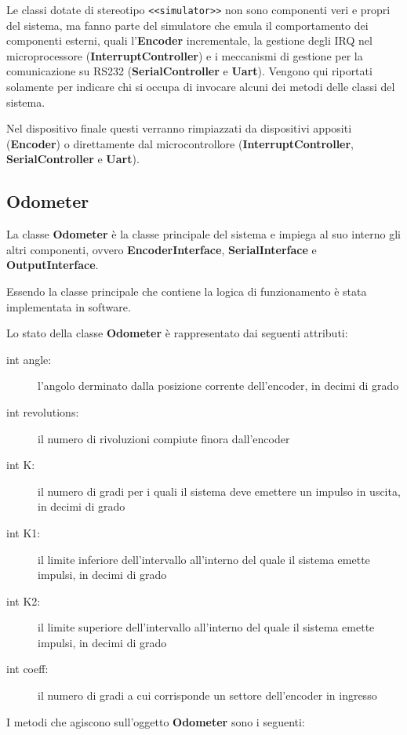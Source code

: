 \documentclass [11pt,a4paper,oneside]{paper}
\newcommand{\component}[1]{\textbf{#1}}
\newcommand{\identifier}[1]{\texttt{#1}}
\begin{document}
Le classi dotate di stereotipo \identifier{<<simulator>>} non sono
componenti veri e propri del sistema, ma fanno parte del simulatore
che emula il comportamento dei componenti esterni, quali
l'\component{Encoder} incrementale, la gestione degli IRQ nel
microprocessore (\component{InterruptController}) e i meccanismi di gestione per la
comunicazione su RS232 (\component{SerialController} e \component{Uart}).
Vengono qui riportati solamente per indicare chi si occupa di invocare
alcuni dei metodi delle classi del sistema.

Nel dispositivo finale questi verranno rimpiazzati da dispositivi appositi
(\component{Encoder}) o direttamente dal microcontrollore
(\component{InterruptController}, \component{SerialController} e
\component{Uart}).

\subsection{Odometer}
La classe \component{Odometer} è la classe principale del sistema e
impiega al suo interno gli altri componenti, ovvero 
\component{EncoderInterface}, \component{SerialInterface} e
\component{OutputInterface}.

Essendo la classe principale che contiene la logica di funzionamento
è stata implementata in software.

Lo stato della classe \component{Odometer} è rappresentato
dai seguenti attributi:

\begin{description}
\item[int angle:] l'angolo derminato dalla posizione corrente dell'encoder,
     in decimi di grado
\item[int revolutions:] il numero di rivoluzioni compiute finora dall'encoder
\item[int K:] il numero di gradi per i quali il sistema deve emettere un
     impulso in uscita, in decimi di grado
\item[int K1:] il limite inferiore dell'intervallo all'interno del quale
     il sistema emette impulsi, in decimi di grado
\item[int K2:] il limite superiore dell'intervallo all'interno del quale
     il sistema emette impulsi, in decimi di grado
\item[int coeff:] il numero di gradi a cui corrisponde un settore
     dell'encoder in ingresso
\end{description}

I metodi che agiscono sull'oggetto \component{Odometer} sono i seguenti:
\end{document}
